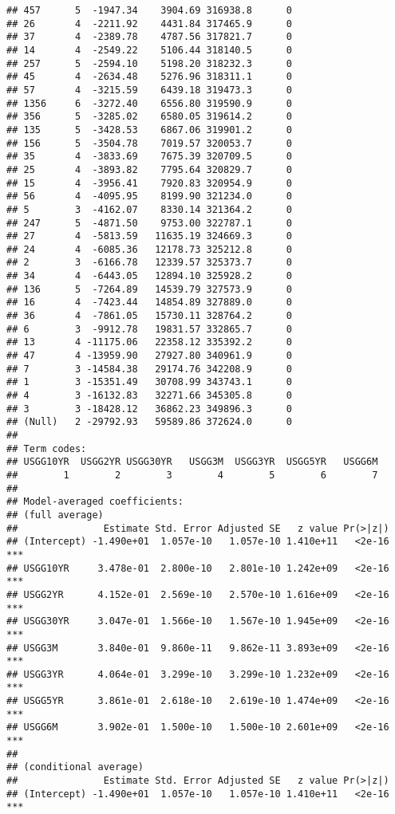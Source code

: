 \documentclass[]{article}
\begin{document}
\begin{verbatim}
## 457      5  -1947.34    3904.69 316938.8      0
## 26       4  -2211.92    4431.84 317465.9      0
## 37       4  -2389.78    4787.56 317821.7      0
## 14       4  -2549.22    5106.44 318140.5      0
## 257      5  -2594.10    5198.20 318232.3      0
## 45       4  -2634.48    5276.96 318311.1      0
## 57       4  -3215.59    6439.18 319473.3      0
## 1356     6  -3272.40    6556.80 319590.9      0
## 356      5  -3285.02    6580.05 319614.2      0
## 135      5  -3428.53    6867.06 319901.2      0
## 156      5  -3504.78    7019.57 320053.7      0
## 35       4  -3833.69    7675.39 320709.5      0
## 25       4  -3893.82    7795.64 320829.7      0
## 15       4  -3956.41    7920.83 320954.9      0
## 56       4  -4095.95    8199.90 321234.0      0
## 5        3  -4162.07    8330.14 321364.2      0
## 247      5  -4871.50    9753.00 322787.1      0
## 27       4  -5813.59   11635.19 324669.3      0
## 24       4  -6085.36   12178.73 325212.8      0
## 2        3  -6166.78   12339.57 325373.7      0
## 34       4  -6443.05   12894.10 325928.2      0
## 136      5  -7264.89   14539.79 327573.9      0
## 16       4  -7423.44   14854.89 327889.0      0
## 36       4  -7861.05   15730.11 328764.2      0
## 6        3  -9912.78   19831.57 332865.7      0
## 13       4 -11175.06   22358.12 335392.2      0
## 47       4 -13959.90   27927.80 340961.9      0
## 7        3 -14584.38   29174.76 342208.9      0
## 1        3 -15351.49   30708.99 343743.1      0
## 4        3 -16132.83   32271.66 345305.8      0
## 3        3 -18428.12   36862.23 349896.3      0
## (Null)   2 -29792.93   59589.86 372624.0      0
## 
## Term codes: 
## USGG10YR  USGG2YR USGG30YR   USGG3M  USGG3YR  USGG5YR   USGG6M 
##        1        2        3        4        5        6        7 
## 
## Model-averaged coefficients:  
## (full average) 
##               Estimate Std. Error Adjusted SE   z value Pr(>|z|)    
## (Intercept) -1.490e+01  1.057e-10   1.057e-10 1.410e+11   <2e-16 ***
## USGG10YR     3.478e-01  2.800e-10   2.801e-10 1.242e+09   <2e-16 ***
## USGG2YR      4.152e-01  2.569e-10   2.570e-10 1.616e+09   <2e-16 ***
## USGG30YR     3.047e-01  1.566e-10   1.567e-10 1.945e+09   <2e-16 ***
## USGG3M       3.840e-01  9.860e-11   9.862e-11 3.893e+09   <2e-16 ***
## USGG3YR      4.064e-01  3.299e-10   3.299e-10 1.232e+09   <2e-16 ***
## USGG5YR      3.861e-01  2.618e-10   2.619e-10 1.474e+09   <2e-16 ***
## USGG6M       3.902e-01  1.500e-10   1.500e-10 2.601e+09   <2e-16 ***
##  
## (conditional average) 
##               Estimate Std. Error Adjusted SE   z value Pr(>|z|)    
## (Intercept) -1.490e+01  1.057e-10   1.057e-10 1.410e+11   <2e-16 ***

\end{verbatim}
\end{document}
